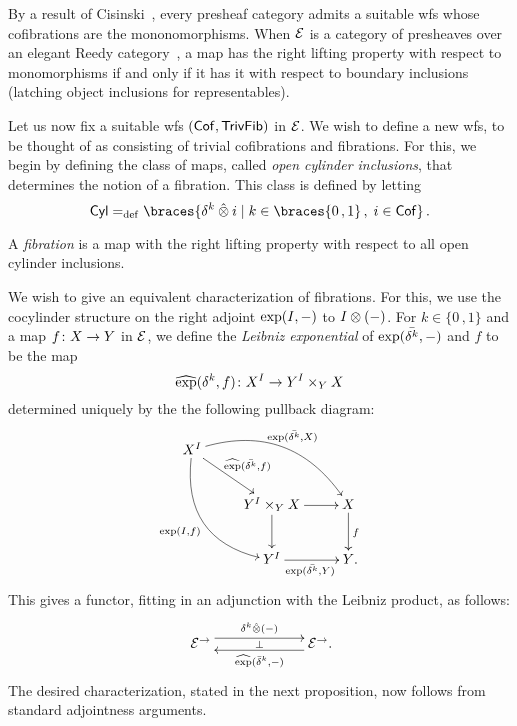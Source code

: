 \documentclass[reqno,10pt,a4paper,oneside,draft]{amsart}
\begin{document}
\begin{example} \label{thm:generation-presheaf-cisinski}
By a result of Cisinski~\cite[Proposition~1.2.27]{cisinski-asterisque}, every presheaf category admits a suitable wfs whose cofibrations are the mononomorphisms.
When $\cal{E}$ is a category of presheaves over an elegant Reedy category~\cite{bergner-rezk-elegant}, a map has the right lifting property with respect to monomorphisms if and only if it has it with respect to boundary inclusions (latching object inclusions for representables).
\end{example}

Let us now fix a suitable wfs $(\Cof,\TrivFib)$ in $\catE$.
We wish to define a new wfs, to be thought of as consisting of trivial cofibrations and fibrations.
For this, we begin by defining the class of maps, called \emph{open cylinder inclusions}, that determines the notion of a fibration.
This class is defined by letting
\begin{equation} \label{equ:cylinc}
\Cyl \defeq \braces{\kcyl \hatotimes i \mid k \in \braces{0\,, 1} \, , \; i \in \Cof}
\, .\end{equation}

\begin{definition} \label{thm:fib}
A \emph{fibration} is a map with the right lifting property with respect to all open cylinder inclusions.
\end{definition}

We wish to give an equivalent characterization of fibrations. 
For this, we use the cocylinder structure on the right adjoint $\exp(\interval, -)$ to $\interval \otimes (-)$.
For $k \in \{ 0 \, , 1 \}$ and a map $f \co X \to Y$ in $\calE$, we define the \emph{Leibniz exponential} of
$\exp(\bar{\kcyl}, -)$ and $f$ to be the map
\[
\hatexp(\kcyl, f) \co X^\interval \to Y^\interval \times_{Y} X 
\]
determined uniquely by the the following pullback diagram:
\[
\xymatrix{
X^\interval \ar@/^2pc/[drr]^-{\exp(\bar{\kcyl}, X)}  \ar@/_2pc/[ddr]_{\exp(\interval, f)} \ar[dr]^-{\hatexp(\bar{\kcyl}, f)} &  & \\
  &   Y^\interval \times_{Y} X    \ar[d] \ar[r]  & X \ar[d]^f \\ 
  & Y^\interval \ar[r]_{\exp(\bar{\kcyl}, Y)} & Y \rlap{.} }
  \]
This gives a functor, fitting in an adjunction with the Leibniz product, as follows:
\begin{equation}
\label{equ:leibniz-prod-exp}
\xymatrix@C+4em{
  \catE^\to
  \ar@<1ex>[r]^{\kcyl \hatotimes (-)}
  \ar@{}[r]|{\bot}
&
  \catE^\to
  \ar@<1ex>[l]^{\hatexp(\bar{\delta}^k, -)}
\rlap{.}}
\end{equation} 
The desired characterization, stated in the next proposition, now follows from standard adjointness arguments.
\end{document}
